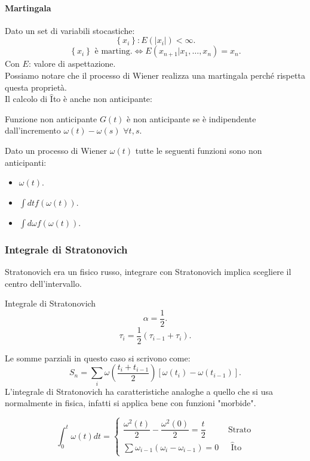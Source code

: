 \paragraph{Martingala}%
\label{par:Martingala}
Dato un set di variabili stocastiche:
\[
    \left\{x_i\right\}: E(\left|x_i\right|) < \infty
.\] 
\[
    \left\{x_i\right\} \text{ è marting.} \iff
    E(x_{n+1}|x_1,\ldots,x_n) = x_n
.\] 
Con $E$: valore di aspettazione.\\
Possiamo notare che il processo di Wiener realizza una martingala perché rispetta questa proprietà.\\
Il calcolo di $\hat{\text{I}}$to è anche non anticipante:
\begin{redbox}{Funzione non anticipante}
    $G(t)$ è non anticipante se è indipendente dall'incremento $\omega (t) - \omega (s) $ $\forall t, s$.
\end{redbox}
\noindent
\begin{exmp}
    Dato un processo di Wiener $\omega (t)$ tutte le seguenti funzioni sono non anticipanti:
    \begin{itemize}
	\item $\omega (t) $.
	\item $\int dt f(\omega (t) ) $.
	\item $\int d\omega f(\omega (t) ) $.
    \end{itemize}
\end{exmp}
\noindent
\subsubsection{Integrale di Stratonovich}%
\label{subsub:Integrale di Stratonovich}
Stratonovich era un fisico russo, integrare con Stratonovich implica scegliere il centro dell'intervallo.
\begin{bluebox}{Integrale di Stratonovich}
    \[
        \alpha = \frac{1}{2}
    .\] 
    \[
        \tau_i = \frac{1}{2}\left(\tau_{i-1}+ \tau_i\right)
    .\] 
\end{bluebox}
\noindent
Le somme parziali in questo caso si scrivono come:
\[
    S_n = \sum_{i}^{} \omega\left(\frac{t_i + t_{i-1}}{2}\right)\left[\omega (t_i) -\omega (t_{i-1}) \right]
.\] 
L'integrale di Stratonovich ha caratteristiche analoghe a quello che si usa normalmente in fisica, infatti si applica bene con funzioni "morbide".

\begin{exmp}[]
    \[
	\int_{0}^{t} \omega (t) dt = 
	\begin{cases}
	    \dfrac{\omega^2(t)}{2}-\dfrac{\omega^2(0)}{2} = \dfrac{t}{2} & \text{ Strato}\\
	    \sum_{}^{} \omega_{i-1}\left(\omega_i-\omega_{i-1}\right) = 0 & \text{ }\hat{\text{I}}\text{to}
	\end{cases}
    \] 
\end{exmp}
\noindent


